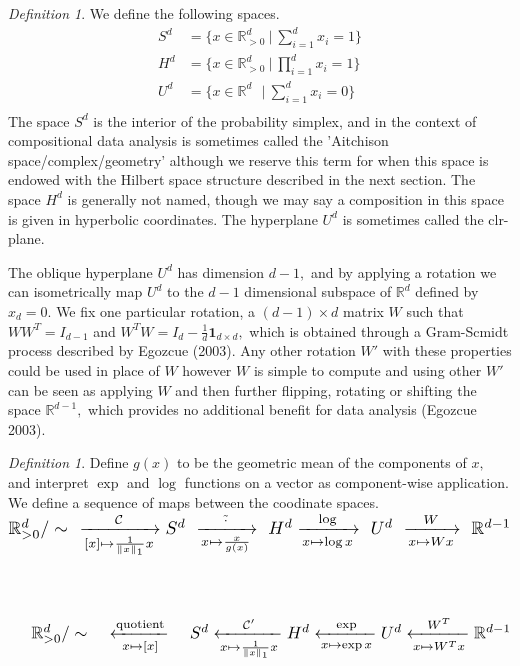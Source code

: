 \documentclass[BSc]{usydthesis}
\numberwithin{equation}{chapter}
\theoremstyle{remark}
\newtheorem{Definition}[equation]{Definition}
\newcommand{\R}{\mathbb{R}}
\begin{document}
\begin{Definition}
 We define the following spaces.
 \begin{align*}
  S^d &= \bigg\{ x \in \mathbb{R}_{>0}^d \ \bigg| \ \sum_{i=1}^d x_i = 1 \bigg\} \\
  H^d &= \bigg\{ x \in \mathbb{R}_{>0}^d \ \bigg| \ \prod_{i=1}^d x_i = 1 \bigg\} \\
  U^d &= \bigg\{ x \in \mathbb{R}^d \ \ \ \bigg| \ \sum_{i=1}^d x_i = 0 \bigg\} \\
 \end{align*}
The space $S^d$ is the interior of the probability simplex, and in the context of compositional data analysis is sometimes called the 'Aitchison space/complex/geometry' although we reserve this term for when this space is endowed with the Hilbert space structure described in the next section. The space $H^d$ is generally not named, though we may say a composition in this space is given in hyperbolic coordinates. The hyperplane $U^d$ is sometimes called the clr-plane. 
\end{Definition}

The oblique hyperplane $U^d$ has dimension $d-1,$ and by applying a rotation we can isometrically map $U^d$ to the $d-1$ dimensional subspace of $\mathbb{R}^{d}$ defined by $x_d=0.$ We fix one particular rotation, a $(d-1) \times d$ matrix $W$ such that $WW^T = I_{d-1}$ and $W^TW = I_d - \frac{1}{d} \mathbf{1}_{d\times d},$ which is obtained through a Gram-Scmidt process described by Egozcue (2003). Any other rotation $W'$ with these properties could be used in place of $W$ however $W$ is simple to compute and using other $W'$ can be seen as applying $W$ and then further flipping, rotating or shifting the space $\mathbb{R}^{d-1},$ which provides no additional benefit for data analysis (Egozcue 2003). 


\begin{Definition}
 Define $g(x)$ to be the geometric mean of the components of $x,$ and interpret $\exp$ and $\log$ functions on a vector as component-wise application. We define a sequence of maps between the coodinate spaces.   \\

$ \scalebox{1.5}{$ \R^d_{> 0}/\sim \ \  \xrightarrow[{[x]\mapsto \frac{1}{\| x\|_1} x }]{{\mathcal{C}}} S^d \  \xrightarrow[{x \mapsto \frac{x}{g(x)}}]{{\tilde{\cdot}}} \ H^d \xrightarrow[{x \mapsto \log x}]{{\log}}\ U^d \ \xrightarrow[{x\mapsto Wx}]{{W}}\ \R^{d-1} $}$
\\
\\
\\
\\
$ \scalebox{1.5}{$ \ \ \ \  \R^d_{> 0}/\sim \ \ \ \ \xleftarrow[{x\mapsto [x] }]{\text{quotient}} \ \ \  S^d \xleftarrow[{x \mapsto \frac{1}{\| x\|_1} x}]{{\mathcal{C}'}} H^d \xleftarrow[{x \mapsto \exp x}]{{\exp}} U^d \xleftarrow[{x\mapsto W^Tx}]{{W^T}}\R^{d-1} $}$
\end{Definition}
\end{document}

